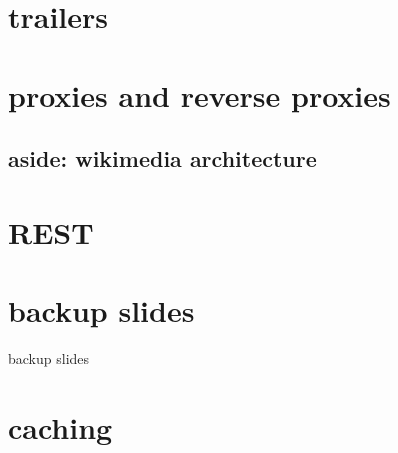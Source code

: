 \section{trailers}


\section{proxies and reverse proxies}


\subsection{aside: wikimedia architecture}


\section{REST}




\section{backup slides}
\begin{frame}{backup slides}
\end{frame}
\section{caching}



